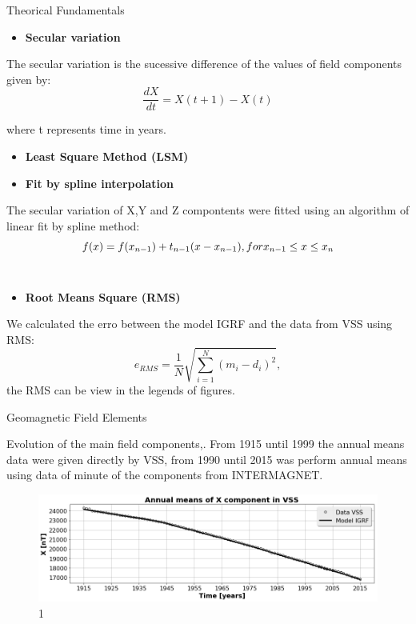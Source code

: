\documentclass[final,t]{beamer}
\begin{document}
\begin{columns}[t]
\begin{column}{.66\linewidth}
\begin{columns}
\begin{column}{.31\linewidth}
\begin{block}{Theorical Fundamentals}
\begin{itemize}
	
	\item \bf{Secular variation}
\end{itemize}
The secular variation is the sucessive difference of the values of field components given by:
\[\frac{dX}{dt} = X(t+1)-X(t)\]

where t represents time in years.

\begin{itemize}
\justifying
		\item \bf{Least Square Method (LSM)}
\end{itemize}

\begin{itemize}
\justifying
		\item \bf{Fit by spline interpolation}
\end{itemize}
The secular variation of X,Y and Z compontents were fitted using an algorithm  of linear fit by spline method: 
	\[ f(x)= f(x_{n-1})+t_{n-1}(x-x_{n-1}), \\
	for x_{n-1} \le x \le x_{n} \]\\

\begin{itemize}
\justifying
		\item \bf{Root Means Square (RMS)}
\end{itemize}
We calculated the erro between the model IGRF and the data from VSS using RMS:
\[e_{RMS}=\frac{1}{N} \sqrt{\sum\limits_{i=1}^{N}(m_{i}-d_{i})^{2}}, 
\]
the RMS can be view in the legends of figures.
 
	
\end{block}	

\begin{block}{Geomagnetic Field Elements}

Evolution of the main field components,. From 1915 until 1999 the  annual means data  were given directly by VSS, from 1990 until 2015 was perform annual means using data of minute of the components from INTERMAGNET.

\begin{figure}
\centering
\includegraphics[width=0.9\linewidth, height=0.1\textheight]{"figs_ed/X mean all_V2"}
\caption[1]{1}
\label{fig:Xmeanall_V2}
\end{figure}
   

\end{block}
\end{column}
\end{columns}
\end{column}
\end{columns}
\end{document}
